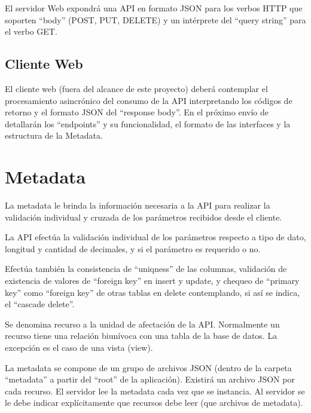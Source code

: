 \documentclass{novela}
\begin{document}
El servidor Web expondrá una API en formato JSON para los verbos HTTP que soporten
“body” (POST, PUT, DELETE) y un intérprete del “query string” para el verbo GET.



\section{Cliente Web}

El cliente web (fuera del alcance de este proyecto) deberá contemplar el
procesamiento asincrónico del consumo de la API interpretando los códigos de retorno
y el formato JSON del “response body”.
En el próximo envío de detallarán los “endpoints” y su funcionalidad, el formato de las
interfaces y la estructura de la Metadata.








\chapter{Metadata}


La metadata le brinda la información necesaria a la API para realizar la validación
individual y cruzada de los parámetros recibidos desde el cliente.

La API efectúa la validación individual de los parámetros respecto a tipo de dato,
longitud y cantidad de decimales, y si el parámetro es requerido o no.

Efectúa también la consistencia de “uniqness” de las columnas, validación de
existencia de valores de “foreign key” en insert y update, y chequeo de “primary key”
como “foreign key” de otras tablas en delete contemplando, si así se indica, el
“cascade delete”.

Se denomina recurso a la unidad de afectación de la API. Normalmente un recurso
tiene una relación biunívoca con una tabla de la base de datos. La excepción es el caso
de una vista (view).

La metadata se compone de un grupo de archivos JSON (dentro de la carpeta
“metadata” a partir del “root” de la aplicación). Existirá un archivo JSON por cada
recurso. El servidor lee la metadata cada vez que se instancia. Al servidor se le debe
indicar explícitamente que recursos debe leer (que archivos de metadata).
\end{document}
